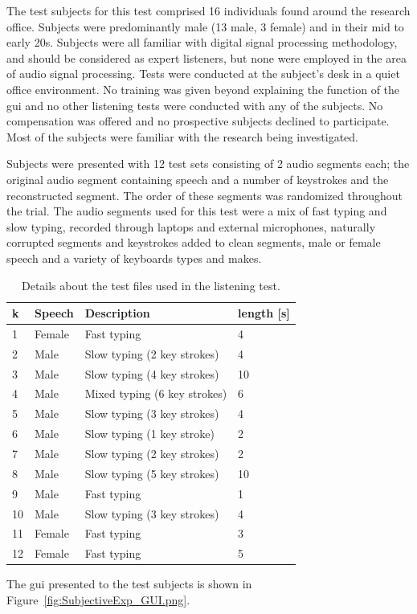\label{corrections:subjects}The test subjects for this test comprised 16 individuals found around the research office. Subjects were predominantly male (13 male, 3 female) and in their mid to early 20s. Subjects were all familiar with digital signal processing methodology, and should be considered as expert listeners, but none were employed in the area of audio signal processing. Tests were conducted at the subject's desk in a quiet office environment. No training was given beyond explaining the function of the \gls{gui} and no other listening tests were conducted with any of the subjects. No compensation was offered and no prospective subjects declined to participate. Most of the subjects were familiar with the research being investigated.

Subjects were presented with 12 test sets consisting of 2 audio segments each; the original audio segment containing speech and a number of keystrokes and the reconstructed segment. The order of these segments was randomized throughout the trial. The audio segments used for this test were a mix of fast typing and slow typing, recorded through laptops and external microphones, naturally corrupted segments and keystrokes added to clean segments, male or female speech and a variety of keyboards types and makes.

\begin{table}
\caption{Details about the test files used in the listening test.} \centering
\begin{tabular}{|l|l|l|l|}
\hline
  k & Speech & Description & length [s] \\ \hline
  1 & Female & Fast typing & 4\\
  2 & Male & Slow typing (2 key strokes) & 4\\
  3 & Male & Slow typing (4 key strokes) & 10\\
  4 & Male & Mixed typing (6 key strokes) & 6\\
  5 & Male & Slow typing (3 key strokes) & 4\\
  6 & Male & Slow typing (1 key stroke) & 2\\
  7 & Male & Slow typing (2 key strokes) & 2\\
  8 & Male & Slow typing (5 key strokes) & 10\\
  9 & Male & Fast typing & 1\\
  10& Male & Slow typing (3 key strokes) & 4\\
  11& Female & Fast typing & 3\\
  12& Female & Fast typing  & 5\\
  \hline
\end{tabular}
 \label{table:ListenerTestFiles}
\end{table}
The \gls{gui} presented to the test subjects is shown in Figure~\ref{fig:SubjectiveExp_GUI.png}.

